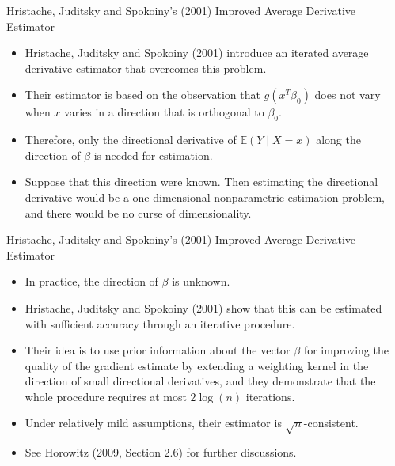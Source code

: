\documentclass[xcolor=svgnames,dvipdfmx,cjk]{beamer}
\theoremstyle{example}
\def\E{\mathbb{E}}
\begin{document}
\begin{frame}{Hristache, Juditsky and Spokoiny's (2001) Improved Average Derivative Estimator}
\begin{itemize}
  \item Hristache, Juditsky and Spokoiny (2001) introduce an iterated average derivative estimator that overcomes this problem.
  \item Their estimator is based on the observation that $g(x^T\beta_0)$ does not vary 
        when $x$ varies in a direction that is orthogonal to $\beta_0$.
  \item Therefore, only the directional derivative of $\E(Y \mid X = x)$ along the direction of $\beta$ is needed for estimation.
  \item Suppose that this direction were known. 
        Then estimating the directional derivative would be a one-dimensional nonparametric estimation problem,
        and there would be no curse of dimensionality.
\end{itemize}
\end{frame}

\begin{frame}{Hristache, Juditsky and Spokoiny's (2001) Improved Average Derivative Estimator}
\begin{itemize}
  \item In practice, the direction of $\beta$ is unknown.
  \item Hristache, Juditsky and Spokoiny (2001) show that this can be estimated with sufficient accuracy 
        through \alert{an iterative procedure}.
  \item Their idea is to use prior information about the vector $\beta$
        for improving the quality of the gradient estimate 
        by extending a weighting kernel in the direction of small directional derivatives,
        and they demonstrate that the whole procedure requires at most $2 \log (n)$ iterations.
  \item Under relatively mild assumptions, their estimator is $\sqrt{n}$-consistent.
  \item See Horowitz (2009, Section 2.6) for further discussions.
\end{itemize}
\end{frame}
\end{document}
